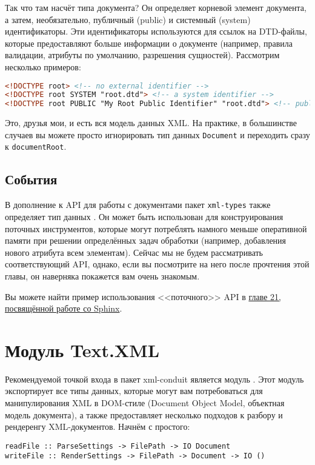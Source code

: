 Так что там насчёт типа документа? Он определяет корневой элемент документа, а
затем, необязательно, публичный (public) и системный (system) идентификаторы.
Эти идентификаторы используются для ссылок на DTD-файлы, которые предоставляют
больше информации о документе (например, правила валидации, атрибуты по
умолчанию, разрешения сущностей). Рассмотрим несколько примеров:
\begin{lstlisting}[language=HTML]
<!DOCTYPE root> <!-- no external identifier -->
<!DOCTYPE root SYSTEM "root.dtd"> <!-- a system identifier -->
<!DOCTYPE root PUBLIC "My Root Public Identifier" "root.dtd"> <!-- public identifiers have a system ID as well -->
\end{lstlisting}

Это, друзья мои, и есть вся модель данных XML. На практике, в большинстве
случаев вы можете просто игнорировать тип данных \lstinline!Document! и
переходить сразу к \lstinline!documentRoot!.

\subsection{События} %
В дополнение к API для работы с документами пакет \lstinline!xml-types! также
определяет тип данных
.
Он может быть использован для конструирования поточных инструментов, которые
могут потреблять намного меньше оперативной памяти при решении определённых
задач обработки (например, добавления нового атрибута всем элементам). Сейчас
мы не будем рассматривать соответствующий API, однако, если вы посмотрите на
него после прочтения этой главы, он наверняка покажется вам очень знакомым.

\begin{remark}
    Вы можете найти пример использования <<поточного>> API в
    \hyperref[chap:sphinx]{главе 21, посвящённой работе со Sphinx}.
\end{remark}

\section{Модуль Text.XML}
Рекомендуемой точкой входа в пакет xml-conduit является модуль
.
Этот модуль экспортирует все типы данных, которые могут вам потребоваться для
манипулирования XML в DOM-стиле (Document Object Model, объектная модель
документа), а также предоставляет несколько подходов к разбору и рендеренгу
XML-документов. Начнём с простого:
\begin{lstlisting}
readFile :: ParseSettings -> FilePath -> IO Document
writeFile :: RenderSettings -> FilePath -> Document -> IO ()
\end{lstlisting}

